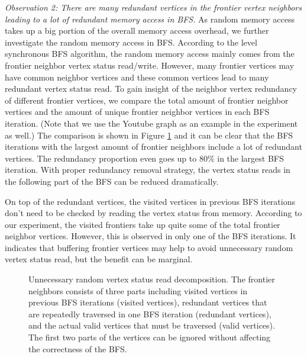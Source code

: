 \textit{Observation 2: There are many redundant vertices in the 
frontier vertex neighbors leading to a lot of redundant memory access in BFS.} 
As random memory access takes up a big portion of the overall memory 
access overhead, we further investigate the random memory access in BFS. 
According to the level synchronous BFS algorithm, the random memory access mainly comes 
from the frontier neighbor vertex status read/write. 
However, many frontier vertices may have common neighbor vertices and these common 
vertices lead to many redundant vertex status read. To gain insight of the neighbor 
vertex redundancy of different frontier vertices, we compare the total amount of frontier 
neighbor vertices and the amount of unique frontier neighbor vertices in each BFS iteration.
(Note that we use the Youtube graph as an example in the experiment as well.) 
The comparison is shown in Figure \ref{fig:repeat-neighbor} and it can be clear that 
the BFS iterations with the largest amount of frontier neighbors include a lot of redundant 
vertices. The redundancy proportion even goes up to 80\% in the largest BFS iteration. 
With proper redundancy removal strategy,
the vertex status reads in the following part of the BFS can be reduced dramatically.

On top of the redundant vertices, the visited vertices in previous 
BFS iterations don't need to be checked by reading the vertex status 
from memory. According to our experiment, the visited frontiers 
take up quite some of the total frontier neighbor vertices. However, this is 
observed in only one of the BFS iterations. It indicates that buffering 
frontier vertices may help to avoid unnecessary random vertex status read, 
but the benefit can be marginal.    

\begin{figure}
\caption{Unnecessary random vertex status read decomposition. 
    The frontier neighbors consists of three parts including visited vertices 
    in previous BFS iterations (visited vertices), 
    redundant vertices that are repeatedly traversed in one BFS iteration (redundant vertices), 
    and the actual valid vertices that must be traversed (valid vertices). 
    The first two parts of the vertices can be ignored without 
    affecting the correctness of the BFS.}
\label{fig:repeat-neighbor}
\end{figure}

